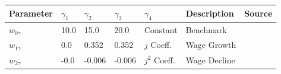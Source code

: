 \small\begin{tabular}{l l l l l l} 
\hline 
 Parameter & $\gamma_1$ &  $\gamma_2$ & $\gamma_3$ & $\gamma_4$ & Description & Source \\ 
\hline 
$w_{0\gamma}$ & 10.0 & 15.0 
               & 20.0 
               & Constant & Benchmark \\ 
$w_{1\gamma}$ & 0.0 & 0.352 
               & 0.352 
               & $j$ Coeff. & Wage Growth \\ 
$w_{2\gamma}$ & -0.0 & -0.006 
               & -0.006  
               & $j^{2}$ Coeff. & Wage Decline \\ 
\hline 
\end{tabular}